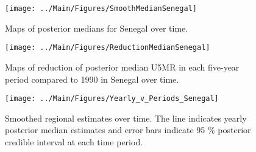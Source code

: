 \documentclass[12pt]{article}\usepackage[]{graphicx}\usepackage[]{color}
\newenvironment{knitrout}{}{} %
\begin{document}
\begin{knitrout}
\color{fgcolor}\begin{figure}[bht]

{\centering \texttt{[image: ../Main/Figures/SmoothMedianSenegal]} 

}

\caption[Maps of posterior medians for Senegal  over time]{Maps of posterior medians for Senegal  over time.}\label{fig:unnamed-chunk-284}
\end{figure}


\end{knitrout}
\begin{knitrout}
\color{fgcolor}\begin{figure}[bht]

{\centering \texttt{[image: ../Main/Figures/ReductionMedianSenegal]} 

}

\caption[Maps of reduction of posterior median U5MR in each five-year period compared to 1990 in Senegal over time]{Maps of reduction of posterior median U5MR in each five-year period compared to 1990 in Senegal over time.}\label{fig:unnamed-chunk-285}
\end{figure}


\end{knitrout}
\begin{knitrout}
\color{fgcolor}\begin{figure}[bht]

{\centering \texttt{[image: ../Main/Figures/Yearly\_v\_Periods\_Senegal]} 

}

\caption[Smoothed regional estimates over time]{Smoothed regional estimates over time. The line indicates yearly posterior median estimates and error bars indicate 95 \% posterior credible interval at each time period.}\label{fig:unnamed-chunk-286}
\end{figure}


\end{knitrout}
\end{document}
